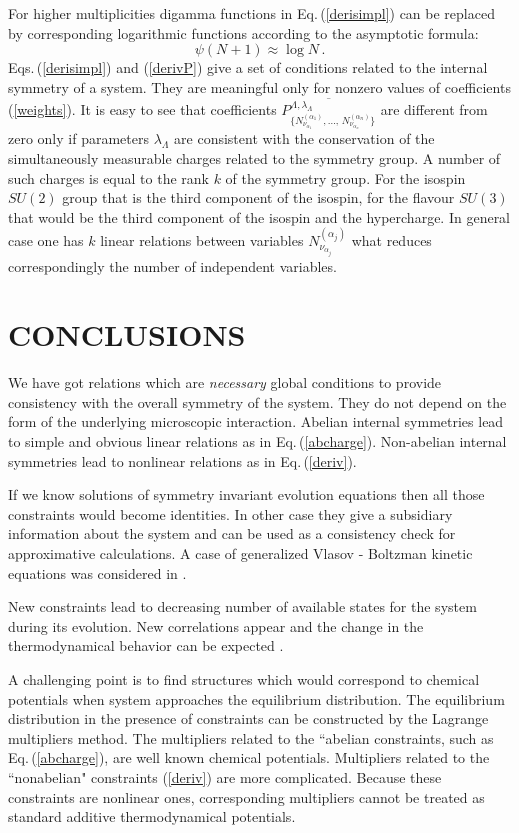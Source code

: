 \documentclass[a4paper,aps]{revtex4}
\begin{document}
For higher multiplicities digamma functions in
Eq.\,(\ref{derisimpl}) can be replaced by corresponding
logarithmic functions according to the asymptotic
formula\cite{Abram}:
\begin{equation}\label{asymptdigamma}
\psi(N+1)\approx\log N\,.
\end{equation}
Eqs.\,(\ref{derisimpl}) and (\ref{derivP}) give a set of
conditions related to the internal symmetry of a system. They are
meaningful only for nonzero values of coefficients
(\ref{weights}). It is easy to see that coefficients
$\overline{P^{\Lambda,\lambda_{\Lambda}}_{\{N^{(\alpha_1)}_{\nu_{\alpha_1}},
\dots,\,N^{(\alpha_n)}_{\nu_{\alpha_n}}\}}}$ are different from
zero only if parameters $\lambda_{\Lambda}$ are consistent with
the conservation of the simultaneously measurable charges related
to the symmetry group. A number of such charges is equal to the
rank $k$ of the symmetry group. For the isospin $SU(2)$ group that
is the third component of the isospin, for the flavour $SU(3)$
that would be the third component of the isospin and the
hypercharge. In general case one has $k$ linear relations between
variables $N^{(\alpha_j)}_{\nu_{\alpha_j}}$ what reduces
correspondingly the number of independent variables.


\section{CONCLUSIONS}

We have got relations which are {\it necessary} global conditions
to provide consistency with the overall symmetry of the system.
They do not depend on the form of the underlying microscopic
interaction.  Abelian internal symmetries lead to simple and
obvious linear relations as in Eq.\,(\ref{abcharge}). Non-abelian
internal symmetries lead to nonlinear relations as in
Eq.\,(\ref{deriv}).

If we know solutions of symmetry invariant evolution equations then all
those constraints would become identities. In other case they give a
subsidiary information about the system and can be  used as a
consistency check for approximative calculations. A case of generalized
Vlasov - Boltzman kinetic equations was considered in \cite{TurRaf}.

New constraints lead to decreasing number of available states for
the system during its evolution. New correlations appear and the
change in the thermodynamical behavior can be expected
\cite{Elze:2001ss}.

A challenging point is to find structures which would correspond
to chemical potentials when system approaches the equilibrium
distribution. The equilibrium distribution in the presence of
constraints can be constructed by the Lagrange multipliers method.
The multipliers related to the ``abelian constraints, such as
Eq.\,(\ref{abcharge}), are well known chemical potentials.
Multipliers related to the ``nonabelian" constraints (\ref{deriv})
are more complicated.  Because these constraints are nonlinear
ones, corresponding multipliers cannot be treated as standard
additive thermodynamical potentials.
\end{document}
